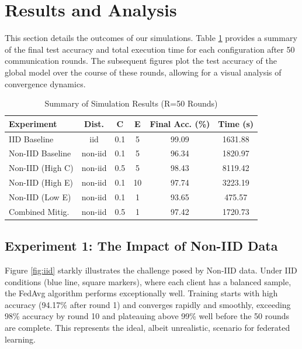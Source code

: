 \documentclass[conference]{IEEEtran}
\begin{document}
\section{Results and Analysis}
This section details the outcomes of our simulations. Table \ref{tab:results} provides a summary of the final test accuracy and total execution time for each configuration after 50 communication rounds. The subsequent figures plot the test accuracy of the global model over the course of these rounds, allowing for a visual analysis of convergence dynamics.

\begin{table}[htbp]
\caption{Summary of Simulation Results (R=50 Rounds)}
\begin{center}
\begin{tabular}{@{}lccccc@{}}
\toprule
\textbf{Experiment} & \textbf{Dist.} & \textbf{C} & \textbf{E} & \textbf{Final Acc. (\%)} & \textbf{Time (s)} \\
\midrule
IID Baseline & iid & 0.1 & 5 & 99.09 & \SI{1631.88}{} \\
Non-IID Baseline & non-iid & 0.1 & 5 & 96.34 & \SI{1820.97}{} \\
Non-IID (High C) & non-iid & 0.5 & 5 & 98.43 & \SI{8119.42}{} \\
Non-IID (High E) & non-iid & 0.1 & 10 & 97.74 & \SI{3223.19}{} \\
Non-IID (Low E) & non-iid & 0.1 & 1 & 93.65 & \SI{475.57}{} \\
Combined Mitig. & non-iid & 0.5 & 1 & 97.42 & \SI{1720.73}{} \\
\bottomrule
\end{tabular}
\label{tab:results}
\end{center}
\end{table}

\subsection{Experiment 1: The Impact of Non-IID Data}
Figure \ref{fig:iid} starkly illustrates the challenge posed by Non-IID data. Under IID conditions (blue line, square markers), where each client has a balanced sample, the FedAvg algorithm performs exceptionally well. Training starts with high accuracy (94.17\% after round 1) and converges rapidly and smoothly, exceeding 98\% accuracy by round 10 and plateauing above 99\% well before the 50 rounds are complete. This represents the ideal, albeit unrealistic, scenario for federated learning.
\end{document}
